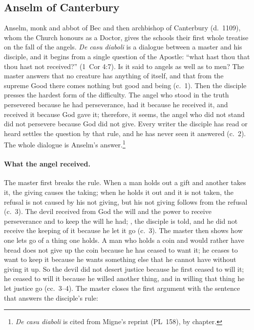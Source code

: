 \sectionguard
\subsection{Anselm of Canterbury}\label{sec:fa-anselm}

Anselm, monk and abbot of Bec and then archbishop of Canterbury (d.~1109),
whom the Church honours as a Doctor, gives the schools their first whole
treatise on the fall of the angels. \emph{De casu diaboli} is a dialogue
between a master and his disciple, and it begins from a single question of
the Apostle: ``what hast thou that thou hast not received?'' (1~Cor 4:7).
Is it said to angels as well as to men? The master answers that no
creature has anything of itself, and that from the supreme Good there comes
nothing but good and being (c.~1). Then the disciple presses the hardest
form of the difficulty. The angel who stood in the truth persevered
because he had perseverance, had it because he received it, and received it
because God gave it; therefore, it seems, the angel who did not stand did not
persevere because God did not give. Every writer the disciple has read or
heard settles the question by that rule, and he has never seen it answered
(c.~2). The whole dialogue is Anselm's answer.\footnote{\emph{De casu
diaboli} is cited from Migne's reprint (PL~158), by chapter.}

\paragraph{What the angel received.} The master first breaks the rule. When
a man holds out a gift and another takes it, the giving causes the taking;
when he holds it out and it is not taken, the refusal is not caused by his
not giving, but his not giving follows from the refusal (c.~3). The devil
received from God the will and the power to receive perseverance and to keep
the will he had; , the disciple is
told, and he did not receive the keeping of it because he let it go (c.~3).
The master then shows how one lets go of a thing one holds. A man who holds
a coin and would rather have bread does not give up the coin because he has
ceased to want it; he ceases to want to keep it because he wants something
else that he cannot have without giving it up. So the devil did not desert
justice because he first ceased to will it; he ceased to will it because he
willed another thing, and in willing that thing he let justice go (cc.~3--4).
The master closes the first argument with the sentence that answers the
disciple's rule:


